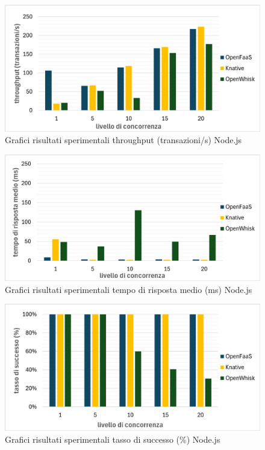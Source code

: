 \documentclass[12pt,a4paper,openany,twoside]{book}
\begin{document}
\begin{figure}[ht]
    \centering
    \includegraphics[width=0.95\linewidth]{figures/graphs/throughput_node.pdf}
    \caption{Grafici risultati sperimentali throughput (transazioni/s) Node.js}
    \label{fig:grafici-throughput-node}
\end{figure}

\begin{figure}[ht]
    \centering
    \includegraphics[width=0.95\linewidth]{figures/graphs/tempoRisposta_node.pdf}
    \caption{Grafici risultati sperimentali tempo di risposta medio (ms) Node.js}
    \label{fig:grafici-tempo-risposta-node}
\end{figure}

\begin{figure}[ht]
    \centering
    \includegraphics[width=0.95\linewidth]{figures/graphs/tassoSuccesso_node.pdf}
    \caption{Grafici risultati sperimentali tasso di successo (\%) Node.js}
    \label{fig:grafici-tasso-successo-node}
\end{figure}
\end{document}
